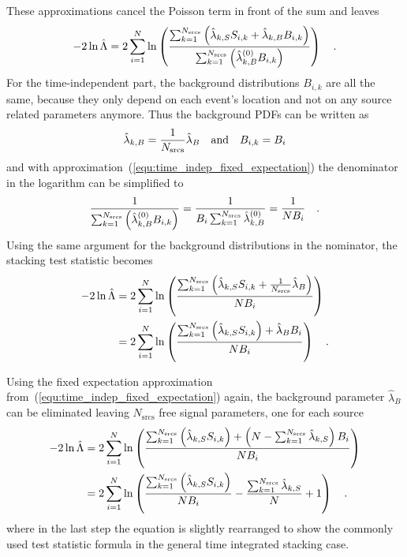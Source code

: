 These approximations cancel the Poisson term in front of the sum and leaves
\begin{equation}
  -2\ln\hat{\Lambda}
  = 2\sum_{i=1}^N \ln\left(
    \frac{\sum_{k=1}^{N_\text{srcs}}\left(
          \hat{\lambda}_{k,S} S_{i,k}+\hat{\lambda}_{k,B} B_{i,k}\right)}
          {\sum_{k=1}^{N_\text{srcs}}\left(
            \hat{\lambda}_{k,B}^{(0)} B_{i,k} \right)}
        \right)
  \quad\text{.}
\end{equation}
For the time-independent part, the background distributions $B_{i,k}$ are all the same, because they only depend on each event's location and not on any source related parameters anymore.
Thus the background PDFs can be written as
\begin{equation}
  \hat{\lambda}_{k,B} = \frac{1}{N_\text{srcs}} \hat{\lambda}_B
  \quad\text{and}\quad B_{i,k} = B_i
\end{equation}
and with approximation~(\ref{equ:time_indep_fixed_expectation}) the denominator in the logarithm can be simplified to
\begin{equation}
  \frac{1}{\sum_{k=1}^{N_\text{srcs}}\left(
           \hat{\lambda}_{k,B}^{(0)}B_{i,k} \right)}
  = \frac{1}{B_i \sum_{k=1}^{N_\text{srcs}}\hat{\lambda}_{k,B}^{(0)}}
  = \frac{1}{N B_i}
  \quad\text{.}
\end{equation}
Using the same argument for the background distributions in the nominator, the stacking test statistic becomes
\begin{align}
  -2\ln\hat{\Lambda}
  &= 2\sum_{i=1}^N \ln\left(
      \frac{\sum_{k=1}^{N_\text{srcs}}
            \left(
              \hat{\lambda}_{k,S} S_{i,k} +
              \frac{1}{N_\text{srcs}} \hat{\lambda}_B
            \right)}{N B_i}
     \right) \\
  &= 2\sum_{i=1}^N \ln\left(
    \frac{\sum_{k=1}^{N_\text{srcs}}\left(\hat{\lambda}_{k,S} S_{i,k}\right) +
          \hat{\lambda}_B B_i}{N B_i} \right)
  \quad\text{.}
\end{align}

Using the fixed expectation approximation from~(\ref{equ:time_indep_fixed_expectation}) again, the background parameter $\hat{\lambda}_B$ can be eliminated leaving $N_\text{srcs}$ free signal parameters, one for each source
\begin{align}
  -2\ln\hat{\Lambda}
  &= 2\sum_{i=1}^N \ln\left(
    \frac{\sum_{k=1}^{N_\text{srcs}}\left(\hat{\lambda}_{k,S} S_{i,k}\right) +
          \left(
            N - \sum_{k=1}^{N_\text{srcs}}\hat{\lambda}_{k,S}
          \right) B_i}{N B_i} \right) \\
  &= 2\sum_{i=1}^N \ln\left(
      \frac{\sum_{k=1}^{N_\text{srcs}}\left(\hat{\lambda}_{k,S}
              S_{i,k}\right)}{N B_i} -
      \frac{\sum_{k=1}^{N_\text{srcs}}\hat{\lambda}_{k,S}}{N} + 1
    \right)
  \quad\text{.}
\end{align}
where in the last step the equation is slightly rearranged to show the commonly used test statistic formula in the general time integrated stacking case.

